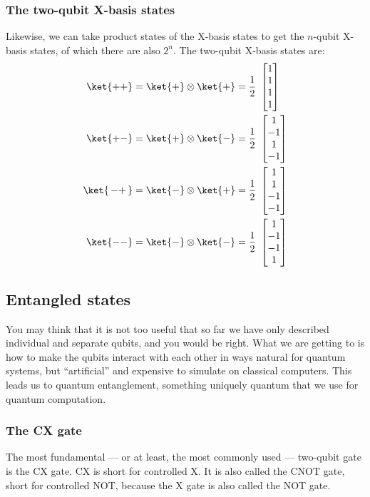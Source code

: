 \documentclass{article}
\theoremstyle{definition}
\newcommand{\kz}[1]{\ket{\,#1\,}}
\newcommand{\kx}[1]{\ket{#1}}
\begin{document}
\subsubsection{The two-qubit X-basis states}
Likewise, we can take product states of the X-basis states to get the $n$-qubit X-basis states, of which there are also $2^n$.
The two-qubit X-basis states are:
\begin{align}
	\kx{++} &= \kx+ \otimes \kx+ = \frac{1}{2} \ \begin{bmatrix}
		1\\
		1\\
		1\\
		1
	\end{bmatrix}\\
	\kx{+-} &= \kx+ \otimes \kx- = \frac{1}{2} \ \begin{bmatrix}
		1\\
		-1\\
		1\\
		-1
	\end{bmatrix}\\
	\kz{-+} &= \kx- \otimes \kx+ = \frac{1}{2} \ \begin{bmatrix}
		1\\
		1\\
		-1\\
		-1
	\end{bmatrix}\\
	\kx{--} &= \kx- \otimes \kx- = \frac{1}{2} \ \begin{bmatrix}
		1\\
		-1\\
		-1\\
		1
	\end{bmatrix}
\end{align}

\subsection{Entangled states}
You may think that it is not too useful that so far we have only described individual and separate qubits, and you would be right.
What we are getting to is how to make the qubits interact with each other in ways natural for quantum systems, but ``artificial'' and expensive to simulate on classical computers.
This leads us to quantum entanglement, something uniquely quantum that we use for quantum computation.

\subsubsection{The CX gate}
The most fundamental --- or at least, the most commonly used --- two-qubit gate is the CX gate.  CX is short for controlled X.  It is also called the CNOT gate, short for controlled NOT, because the X gate is also called the NOT gate.
\end{document}
